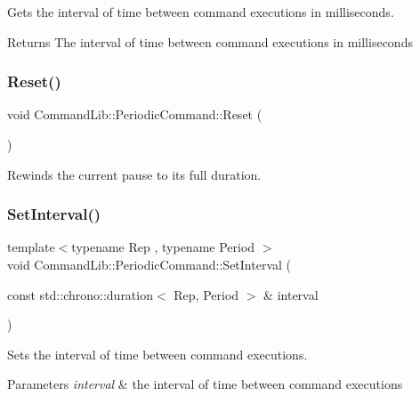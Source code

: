Gets the interval of time between command executions in milliseconds. 

\begin{DoxyReturn}{Returns}
The interval of time between command executions in milliseconds
\end{DoxyReturn}
\mbox{\label{class_command_lib_1_1_periodic_command_ad07aa39b59712f784b16419fe055783c}} 
\subsubsection{\texorpdfstring{Reset()}{Reset()}}
{\footnotesize\ttfamily void Command\+Lib\+::\+Periodic\+Command\+::\+Reset (\begin{DoxyParamCaption}{ }\end{DoxyParamCaption})}



Rewinds the current pause to its full duration. 

\mbox{\label{class_command_lib_1_1_periodic_command_af344626ecaa9e0ecb85fd2f98100eba9}} 
\subsubsection{\texorpdfstring{Set\+Interval()}{SetInterval()}}
{\footnotesize\ttfamily template$<$typename Rep , typename Period $>$ \\
void Command\+Lib\+::\+Periodic\+Command\+::\+Set\+Interval (\begin{DoxyParamCaption}\item[{const std\+::chrono\+::duration$<$ Rep, Period $>$ \&}]{interval }\end{DoxyParamCaption})\hspace{0.3cm}{\ttfamily [inline]}}



Sets the interval of time between command executions. 


\begin{DoxyParams}{Parameters}
{\em interval} & the interval of time between command executions\\
\hline
\end{DoxyParams}


